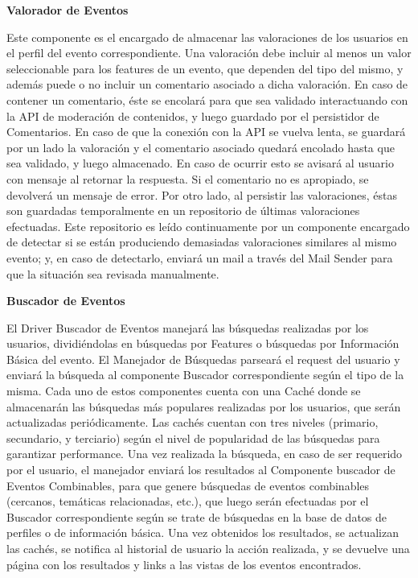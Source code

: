 \textbf{Valorador de Eventos}

Este componente es el encargado de almacenar las valoraciones de los usuarios en el perfil del evento correspondiente. Una valoración debe incluir al menos un valor seleccionable para los features de un evento, que dependen del tipo del mismo, y además puede o no incluir un comentario asociado a dicha valoración. En caso de contener un comentario, éste se encolará para que sea validado interactuando con la API de moderación de contenidos, y luego guardado por el persistidor de Comentarios. En caso de que la conexión con la API se vuelva lenta, se guardará por un lado la valoración y el comentario asociado quedará encolado hasta que sea validado, y luego almacenado. En caso de ocurrir esto se avisará al usuario con mensaje al retornar la respuesta. Si el comentario no es apropiado, se devolverá un mensaje de error. Por otro lado, al persistir las valoraciones, éstas son guardadas temporalmente en un repositorio de últimas valoraciones efectuadas. Este repositorio es leído continuamente por un componente encargado de detectar si se están produciendo demasiadas valoraciones similares al mismo evento; y, en caso de detectarlo, enviará un mail a través del Mail Sender para que la situación sea revisada manualmente.

\textbf{Buscador de Eventos}

El Driver Buscador de Eventos manejará las búsquedas realizadas por los usuarios, dividiéndolas en búsquedas por Features o búsquedas por Información Básica del evento. El Manejador de Búsquedas parseará el request del usuario y enviará la búsqueda al componente Buscador correspondiente según el tipo de la misma. Cada uno de estos componentes cuenta con una Caché donde se almacenarán las búsquedas más populares realizadas por los usuarios, que serán actualizadas periódicamente. Las cachés cuentan con tres niveles (primario, secundario, y terciario) según el nivel de popularidad de las búsquedas para garantizar performance. Una vez realizada la búsqueda, en caso de ser requerido por el usuario, el manejador enviará los resultados al Componente buscador de Eventos Combinables, para que genere búsquedas de eventos combinables (cercanos, temáticas relacionadas, etc.), que luego serán efectuadas por el Buscador correspondiente según se trate de búsquedas en la base de datos de perfiles o de información básica. Una vez obtenidos los resultados, se actualizan las cachés, se notifica al historial de usuario la acción realizada, y se devuelve una página con los resultados y links a las vistas de los eventos encontrados.



